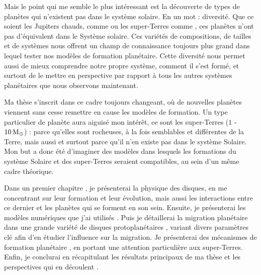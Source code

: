 Mais le point qui me semble le plus intéressant est la découverte de types de planètes qui n'existent pas dans le système
solaire. En un mot : diversité. Que ce soient les Jupiters chauds, comme  ou les super-Terres comme
, ces planètes n'ont pas d'équivalent dans le Système solaire. Ces variétés de compositions, de tailles et de
systèmes nous offrent un champ de connaissance toujours plus grand dans lequel tester nos modèles de formation planétaire.
Cette diversité nous permet aussi de mieux comprendre notre propre système, comment il s'est formé, et surtout de le mettre
en perspective par rapport à tous les autres systèmes planétaires que nous observons maintenant.

Ma thèse s'inscrit dans ce cadre toujours changeant, où de nouvelles planètes viennent sans cesse remettre en cause les modèles
de formation. Un type particulier de planète aura aiguisé mon intérêt, ce sont les super-Terres ($1$ - $10\mathrm{\thinspace M_\oplus}$) : parce
qu'elles sont rocheuses, à la fois semblables et différentes de la Terre, mais aussi et surtout parce qu'il n'en existe pas dans
le système Solaire. Mon but a donc été d'imaginer des modèles dans lesquels les formations du système Solaire et des
super-Terres seraient compatibles, au sein d'un même cadre théorique.

Dans un premier chapitre , je présenterai la physique des disques, en me concentrant sur leur formation et leur évolution, mais aussi les interactions entre ce dernier et les planètes qui se forment en son sein. Ensuite, je
présenterai les modèles numériques que j'ai utilisés . Puis je détaillerai la migration planétaire dans une
grande variété de disques protoplanétaires , variant divers paramètres clé afin d'en étudier l'influence sur
la migration. Je présenterai des mécanismes de formation planétaire , en portant une attention particulière
aux super-Terres. Enfin, je conclurai en récapitulant les résultats principaux de ma thèse et les perspectives qui en découlent
.
